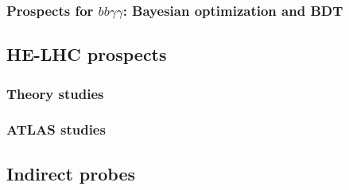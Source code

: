 \documentclass[../report.tex]{subfiles}
\providecommand{\main}{..}
\begin{document}

\subsubsection{Prospects for $bb\gamma\gamma $: Bayesian optimization and BDT}












\subsection{HE-LHC prospects}
\label{sec:HH_HE}

\subsubsection{Theory studies}


\subsubsection{ATLAS studies}




\subsection{Indirect probes}
\label{sec:HH_indirect}
\end{document}
